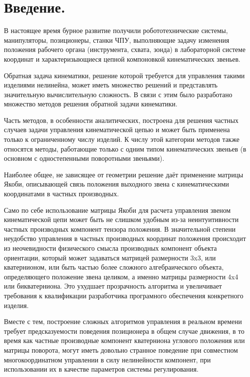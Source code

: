 \section{Введение.}

В настоящее время бурное развитие получили робототехнические системы, манипуляторы, позиционеры, станки ЧПУ, выполняющие задачу изменения положения рабочего органа (инструмента, схвата, зонда) в лабораторной системе координат и характеризыющиеся цепной компоновкой кинематических звеньев.

Обратная задача кинематики, решение которой требуется для управления такими изделиями нелинейна, может иметь множество решений и представлять значительную вычислительную сложность. В связи с этим было разработано множество методов решения обратной задачи кинематики.

Часть методов, в особенности аналитических, построена для решения частных случаев задачи управления кинематической цепью и может быть применена только к ограниченному числу изделий. К числу этой категории методов также относятся методы, работающие только с одним типом кинематических звеньев (в основном с одностепенными поворотными звеньями).

Наиболее общее, не зависящее от геометрии решение даёт применение матрицы Якоби, описывающей связь положения выходного звена с кинематическими координатами в частных производных.

Само по себе использование матрицы Якоби для расчета управления звеном кинематической цепи может быть не слишком удобным из-за неинтуитивности частных производных компонент тензора положения. В значительной степени неудобство управления в частных производных координат положения происходит из неочевидности физического смысла производных компонент объекта ориентации, который может задаваться матрицей размерности 3x3, или кватернионом, или быть частью более сложного алгебраического объекта, определяющего положение звена целиком, а именно матрицы размерности 4x4 или бикватерниона. Это ухудшает прозрачность алгоритма и увеличивает требования к квалификации разработчика програмного обеспечения конкретного изделия.

Вместе с тем, построение сложных алгоритмов управления в реальном времени требует предсказуемости поведения позиционера в общем случае движения, в то время как частные производные компонент кватерниона углового положения или матрицы поворота, могут иметь довольно странное поведение при совместном многокоординатном управлении в силу нелинейности компонент, при использовании их в качестве параметров системы регулирования. 


